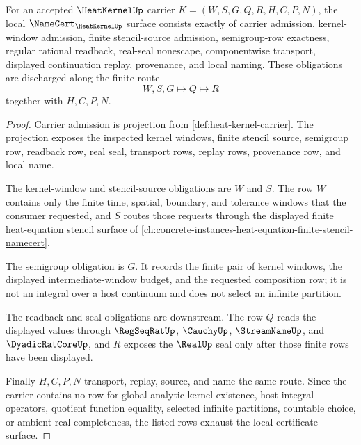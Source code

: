 \begin{theorem}
\label{thm:heat-kernel-namecert-obligations}
For an accepted $\HeatKernelUp$ carrier
$K=(W,S,G,Q,R,H,C,P,N)$, the local $\NameCert_{\HeatKernelUp}$ surface consists
exactly of carrier admission, kernel-window admission, finite stencil-source
admission, semigroup-row exactness, regular rational readback, real-seal
nonescape, componentwise transport, displayed continuation replay, provenance,
and local naming. These obligations are discharged along the finite route
$$
W,S,G\longmapsto Q\longmapsto R
$$
together with $H,C,P,N$.
\end{theorem}
\begin{proof}
Carrier admission is projection from \autoref{def:heat-kernel-carrier}. The
projection exposes the inspected kernel windows, finite stencil source,
semigroup row, readback row, real seal, transport rows, replay rows,
provenance row, and local name.

The kernel-window and stencil-source obligations are $W$ and $S$. The row $W$
contains only the finite time, spatial, boundary, and tolerance windows that
the consumer requested, and $S$ routes those requests through the displayed
finite heat-equation stencil surface of
\autoref{ch:concrete-instances-heat-equation-finite-stencil-namecert}.

The semigroup obligation is $G$. It records the finite pair of kernel windows,
the displayed intermediate-window budget, and the requested composition row;
it is not an integral over a host continuum and does not select an infinite
partition.

The readback and seal obligations are downstream. The row $Q$ reads the
displayed values through $\RegSeqRatUp$, $\CauchyUp$, $\StreamNameUp$, and
$\DyadicRatCoreUp$, and $R$ exposes the $\RealUp$ seal only after those finite
rows have been displayed.

Finally $H,C,P,N$ transport, replay, source, and name the same route. Since
the carrier contains no row for global analytic kernel existence, host
integral operators, quotient function equality, selected infinite partitions,
countable choice, or ambient real completeness, the listed rows exhaust the
local certificate surface.
\end{proof}

